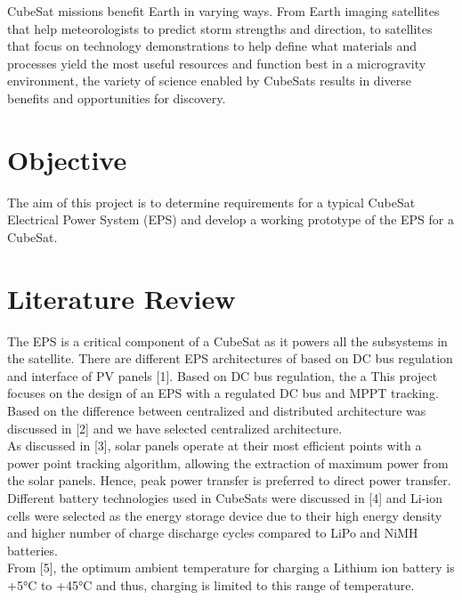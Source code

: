 CubeSat missions benefit Earth in varying ways. From Earth imaging satellites that
help meteorologists to predict storm strengths and direction, to satellites that focus
on technology demonstrations to help define what materials and processes yield the
most useful resources and function best in a microgravity environment, the variety
of science enabled by CubeSats results in diverse benefits and opportunities for
discovery.

\section{Objective}

The aim of this project is to determine requirements for a typical CubeSat Electrical Power System (EPS) and develop a working prototype of the EPS for a CubeSat.

\section{Literature Review}
\justifying
The EPS is a critical component of a CubeSat as it powers all the subsystems in the satellite. There are different EPS architectures of based on DC bus regulation and interface of PV panels [1].
Based on DC bus regulation, the a
 This project focuses on the design of an EPS with a regulated DC bus and MPPT tracking.
%
\\

Based on the difference between centralized and distributed architecture was discussed in [2] and we have selected centralized architecture.
\\

As discussed in [3], solar panels operate at their most efficient points with a power point tracking algorithm, allowing the extraction of maximum power from the solar panels. Hence, peak power transfer is preferred to direct power transfer.
\\

Different battery technologies used in CubeSats were discussed in [4] and Li-ion cells were selected as the energy storage device due to their high energy density and higher number of charge discharge cycles compared to LiPo and NiMH batteries.
\\

From [5], the optimum ambient temperature for charging a Lithium ion battery is +5°C to +45°C and thus, charging is limited to this range of temperature.